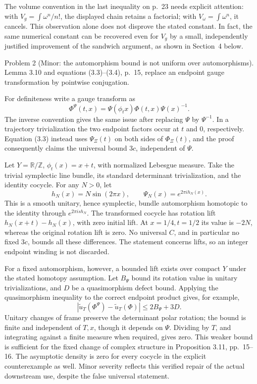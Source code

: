 \documentclass[10pt]{article}
\begin{document}
The volume convention in the last inequality on p. 23 needs explicit attention: with \(V_g=\int\omega^n/n!\), the displayed chain retains a factorial; with \(V_\omega=\int\omega^n\), it cancels. This observation alone does not disprove the stated constant. In fact, the same numerical constant can be recovered even for \(V_g\) by a small, independently justified improvement of the sandwich argument, as shown in Section 4 below.\par
Problem 2 (Minor: the automorphism bound is not uniform over automorphisms).  Lemma 3.10 and equations (3.3)–(3.4), p. 15, replace an endpoint gauge transformation by pointwise conjugation.\par
For definiteness write a gauge transform as \[\Phi^\Psi(t,x)=\Psi(\phi_t x)\Phi(t,x)\Psi(x)^{-1}.\] The inverse convention gives the same issue after replacing \(\Psi\) by \(\Psi^{-1}\). In a trajectory trivialization the two endpoint factors occur at \(t\) and \(0\), respectively. Equation (3.3) instead uses \(\Psi_\Xi(t)\) on both sides of \(\Phi_\Xi(t)\), and the proof consequently claims the universal bound \(3c\), independent of \(\Psi\).\par
Let \(Y=\mathbb R/\mathbb Z\), \(\phi_t(x)=x+t\), with normalized Lebesgue measure. Take the trivial symplectic line bundle, its standard determinant trivialization, and the identity cocycle. For any \(N>0\), let \[h_N(x)=N\sin(2\pi x),\qquad \Psi_N(x)=e^{2\pi i h_N(x)}.\] This is a smooth unitary, hence symplectic, bundle automorphism homotopic to the identity through \(e^{2\pi i s h_N}\). The transformed cocycle has rotation lift \(h_N(x+t)-h_N(x)\), with zero initial lift. At \(x=1/4,t=1/2\) its value is \(-2N\), whereas the original rotation lift is zero. No universal \(C\), and in particular no fixed \(3c\), bounds all these differences. The statement concerns lifts, so an integer endpoint winding is not discarded.\par
For a fixed automorphism, however, a bounded lift exists over compact \(Y\) under the stated homotopy assumption. Let \(B_\Psi\) bound its rotation value in unitary trivializations, and \(D\) be a quasimorphism defect bound. Applying the quasimorphism inequality to the correct endpoint product gives, for example, \[|\widetilde u_T(\Phi^\Psi)-\widetilde u_T(\Phi)|
       \le 2B_\Psi+3D .\] Unitary changes of frame preserve the determinant polar rotation; the bound is finite and independent of \(T,x\), though it depends on \(\Psi\). Dividing by \(T\), and integrating against a finite measure when required, gives zero. This weaker bound is sufficient for the fixed change of complex structure in Proposition 3.11, pp. 15–16. The asymptotic density is zero for every cocycle in the explicit counterexample as well. Minor severity reflects this verified repair of the actual downstream use, despite the false universal statement.\par
\end{document}

